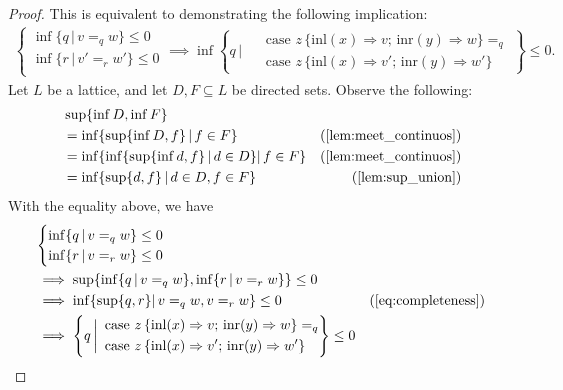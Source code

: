 \begin{proof}
   This is equivalent to demonstrating the following implication:
   \begin{align*}
    \begin{cases}
      \inf \{ q \, \vert \, v=_q w \} \leq 0 \\
      \inf \{ r \, \vert \, v'=_r w' \} \leq 0 \\
    \end{cases} \implies \inf \left\{q \, \bigg\vert \,  
    \begin{aligned}
       &\text{ case } z \,   \{\text{inl} (x) \Rightarrow v ; \, \text{inr} (y) \Rightarrow w\} =_{q} \\
       &\text{ case } z \,  \{\text{inl} (x) \Rightarrow v' ; \,\text{inr} (y) \Rightarrow w'\}
    \end{aligned}\right\} \leq 0.
   \end{align*}
Let $L$ be a lattice, and let $D, F \subseteq L$ be directed sets. Observe the following:
\begin{equation} \label{eq:completeness}
  \begin{split}
     & \sup \{ \inf D, \inf F \} \\\
    & = \inf \{ \sup \{\inf D, f\} \, \vert \, f \in F \} & (\text{\autoref{lem:meet_continuos}}) \\
    & = \inf \{ \inf\{ \sup \{\inf d, f\} \,\vert \, d \in D \} \vert \, f \in F \} & (\text{\autoref{lem:meet_continuos}}) \\
    & =  \inf \{  \sup \{d,f\} \, \vert \, d \in D, f \in F \} & (\text{\autoref{lem:sup_union}})
  \end{split}
  \end{equation}
With the equality above, we have
\begin{align*}
    &\begin{cases}
      \inf \{ q \, \vert \, v=_q w \} \leq 0 \\
      \inf \{ r \, \vert \, v=_r w \} \leq 0 \\
    \end{cases} \\
    &\implies  \sup \{ \inf \{ q \, \vert \, v=_q w \} , \inf \{ r \, \vert \, v=_r w \} \} \leq 0 \\
    & \implies \inf \{ \sup \{q,r\} \vert \,  v=_q w,  v=_r w  \} \leq 0 & (\text{\autoref{eq:completeness}})  \\
    & \implies \left\{q \, \bigg\vert \,  
    \begin{aligned}
       &\text{ case } z \,   \{\text{inl} (x) \Rightarrow v ; \, \text{inr} (y) \Rightarrow w\} =_{q}\\
        &\text{ case } z \,  \{\text{inl} (x) \Rightarrow v' ; \,\text{inr} (y) \Rightarrow w'\}
    \end{aligned}\right\} \leq 0
  \end{align*}


\end{proof}
